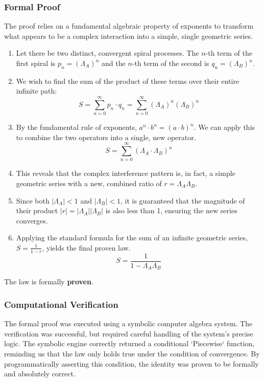 \subsubsection*{Formal Proof}
The proof relies on a fundamental algebraic property of exponents to transform what appears to be a complex interaction into a simple, single geometric series.

\begin{enumerate}
    \item Let there be two distinct, convergent spiral processes. The $n$-th term of the first spiral is $p_n = (\Lambda_A)^n$ and the $n$-th term of the second is $q_n = (\Lambda_B)^n$.

    \item We wish to find the sum of the product of these terms over their entire infinite path:
    $$ S = \sum_{n=0}^{\infty} p_n \cdot q_n = \sum_{n=0}^{\infty} (\Lambda_A)^n (\Lambda_B)^n $$

    \item By the fundamental rule of exponents, $a^n \cdot b^n = (a \cdot b)^n$. We can apply this to combine the two operators into a single, new operator.
    $$ S = \sum_{n=0}^{\infty} (\Lambda_A \cdot \Lambda_B)^n $$

    \item This reveals that the complex interference pattern is, in fact, a simple geometric series with a new, combined ratio of $r = \Lambda_A \Lambda_B$.

    \item Since both $|\Lambda_A|<1$ and $|\Lambda_B|<1$, it is guaranteed that the magnitude of their product $|r| = |\Lambda_A||\Lambda_B|$ is also less than 1, ensuring the new series converges.

    \item Applying the standard formula for the sum of an infinite geometric series, $S = \frac{1}{1-r}$, yields the final proven law.
    $$ S = \frac{1}{1 - \Lambda_A \Lambda_B} $$
\end{enumerate}
The law is formally \textbf{proven}.

\subsubsection*{Computational Verification}
The formal proof was executed using a symbolic computer algebra system. The verification was successful, but required careful handling of the system's precise logic. The symbolic engine correctly returned a conditional `Piecewise` function, reminding us that the law only holds true under the condition of convergence. By programmatically asserting this condition, the identity was proven to be formally and absolutely correct.

